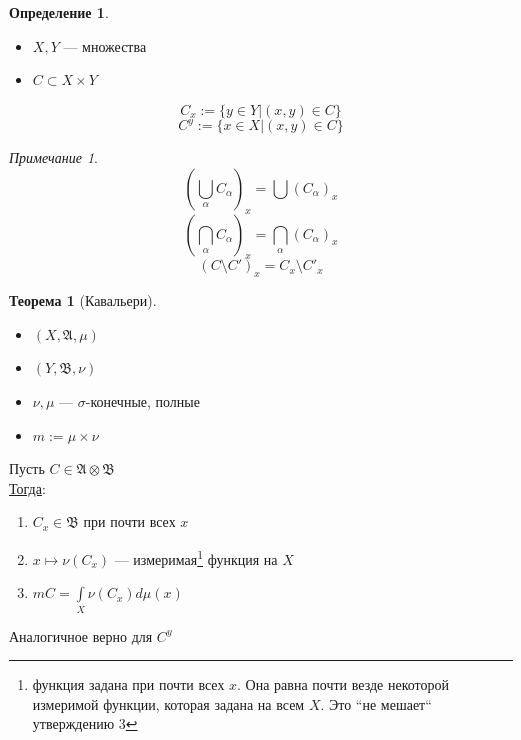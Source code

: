 \documentclass[oneside]{book}
\newcommand{\A}{\mathfrak{A}}
\newcommand{\B}{\mathfrak{B}}
\theoremstyle{plain}
\theoremstyle{remark}
\newtheorem*{remark}{Примечание}
\theoremstyle{definition}
\newtheorem{theorem}{Теорема}[section]
\newtheorem*{definition}{Определение}
\begin{document}
\begin{definition}
\-
\begin{itemize}
\item \(X, Y\) --- множества
\item \(C \subset X \times Y\)
\end{itemize}
\[ C_x := \{y \in Y| (x, y) \in C\} \]
\[ C^y := \{x \in X| (x, y) \in C \} \]
\end{definition}
\begin{remark}
\[ \left(\bigcup\limits_\alpha C_\alpha\right)_x = \bigcup\left(C_\alpha\right)_x \]
\[ \left(\bigcap\limits_\alpha C_\alpha\right)_x = \bigcap\limits_\alpha\left(C_\alpha\right)_x \]
\[ \left(C \setminus C'\right)_x = C_x \setminus C'_x \]
\end{remark}
\begin{theorem}[Кавальери]
\-
\begin{itemize}
\item \((X, \A, \mu)\)
\item \((Y, \B, \nu)\)
\item \(\nu, \mu\) --- \(\sigma\)-конечные, полные
\item \(m := \mu \times \nu\)
\end{itemize}
Пусть \(C \in \A \otimes \B\) \\
\uline{Тогда}:
\begin{enumerate}
\item \(C_x \in \B\) при почти всех \(x\)
\item \(x \mapsto \nu(C_x)\) --- измеримая\footnote{функция задана при почти всех \(x\). Она равна почти везде некоторой измеримой функции, которая задана на всем \(X\). Это ``не мешает`` утверждению 3} функция на \(X\)
\item \(mC = \int\limits_X \nu(C_x)d\mu(x)\)
\end{enumerate}
Аналогичное верно для \(C^y\)
\end{theorem}
\end{document}
